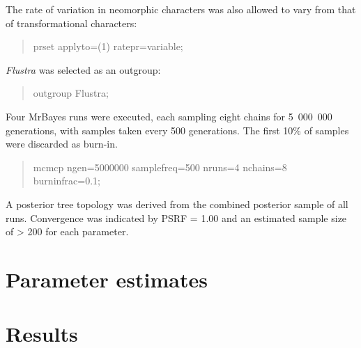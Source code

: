 \documentclass[openany]{book}
\theoremstyle{definition}
\theoremstyle{definition}
\theoremstyle{definition}
\theoremstyle{remark}
\begin{document}
The rate of variation in neomorphic characters was also allowed to vary
from that of transformational characters:

\begin{quote}
prset applyto=(1) ratepr=variable;
\end{quote}

\emph{Flustra} was selected as an outgroup:

\begin{quote}
outgroup Flustra;
\end{quote}

Four MrBayes runs were executed, each sampling eight chains for
5~000~000 generations, with samples taken every 500 generations. The
first 10\% of samples were discarded as burn-in.

\begin{quote}
mcmcp ngen=5000000 samplefreq=500 nruns=4 nchains=8 burninfrac=0.1;
\end{quote}

A posterior tree topology was derived from the combined posterior sample
of all runs. Convergence was indicated by PSRF = 1.00 and an estimated
sample size of \textgreater{} 200 for each parameter.

\section{Parameter estimates}\label{parameter-estimates}

\section{Results}\label{results-2}


\end{document}
